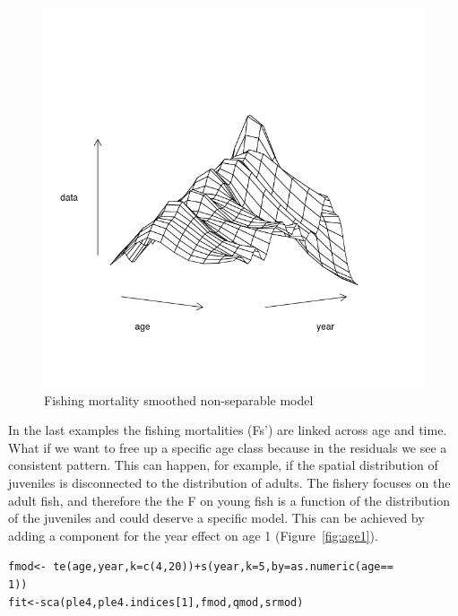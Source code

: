 \documentclass[a4paper,english,10pt]{article}\usepackage[]{graphicx}\usepackage[]{color}
\makeatletter
\newcommand{\hlnum}[1]{\textcolor[rgb]{0.063,0.58,0.627}{#1}}%
\newcommand{\hlopt}[1]{\textcolor[rgb]{0.196,0.196,0.196}{#1}}%
\newcommand{\hlstd}[1]{\textcolor[rgb]{0.196,0.196,0.196}{#1}}%
\newcommand{\hlkwb}[1]{\textcolor[rgb]{0.627,0,0.314}{#1}}%
\newcommand{\hlkwc}[1]{\textcolor[rgb]{0,0.631,0.314}{#1}}%
\newcommand{\hlkwd}[1]{\textcolor[rgb]{0.78,0.227,0.412}{#1}}%
\newenvironment{kframe}{%
 \def\at@end@of@kframe{}%
 \ifinner\ifhmode%
  \def\at@end@of@kframe{\end{minipage}}%
  \begin{minipage}{\columnwidth}%
 \fi\fi%
 \def\FrameCommand##1{\hskip\@totalleftmargin \hskip-\fboxsep
 \colorbox{shadecolor}{##1}\hskip-\fboxsep
     \hskip-\linewidth \hskip-\@totalleftmargin \hskip\columnwidth}%
 \MakeFramed {\advance\hsize-\width
   \@totalleftmargin\z@ \linewidth\hsize
   \@setminipage}}%
 {\par\unskip\endMakeFramed%
 \at@end@of@kframe}
\newenvironment{knitrout}{}{} %
\makeatother
\begin{document}
\begin{knitrout}
\color{fgcolor}\begin{figure}[H]

{\centering \includegraphics[width=.9\linewidth]{figure/te1-1} 

}

\caption[Fishing mortality smoothed non-separable model]{Fishing mortality smoothed non-separable model}\label{fig:te1}
\end{figure}


\end{knitrout}

In the last examples the fishing mortalities (Fs') are linked across age and time.  What if we want to free up a specific age class because in the residuals we see a consistent pattern.  This can happen, for example, if the spatial distribution of juveniles is disconnected to the distribution of adults.  The fishery focuses on the adult fish, and therefore the the F on young fish is a function of the distribution of the juveniles and could deserve a specific model. This can be achieved by adding a component for the year effect on age 1 (Figure~\ref{fig:age1}).

\begin{knitrout}
\color{fgcolor}\begin{kframe}
\begin{alltt}
\hlstd{fmod} \hlkwb{<-} \hlopt{~}\hlkwd{te}\hlstd{(age, year,} \hlkwc{k} \hlstd{=} \hlkwd{c}\hlstd{(}\hlnum{4}\hlstd{,} \hlnum{20}\hlstd{))} \hlopt{+} \hlkwd{s}\hlstd{(year,} \hlkwc{k} \hlstd{=} \hlnum{5}\hlstd{,} \hlkwc{by} \hlstd{=} \hlkwd{as.numeric}\hlstd{(age} \hlopt{==}
    \hlnum{1}\hlstd{))}
\hlstd{fit} \hlkwb{<-} \hlkwd{sca}\hlstd{(ple4, ple4.indices[}\hlnum{1}\hlstd{], fmod, qmod, srmod)}
\end{alltt}
\end{kframe}
\end{knitrout}
\end{document}
